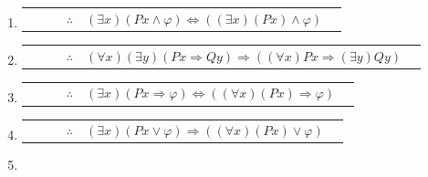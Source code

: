 \documentclass[12pt]{report}
\theoremstyle{largebreak}
\newcounter{tablec}
\begin{document}
\begin{excer}
\begin{enumerate}[label=($\alph*$)]
\begin{center}
\begin{tabular}{l r l c l r}
                \end{tabular}
            \end{center}
            \item \begin{center}
                \setcounter{tablec}{1}
                \begin{tabular}{l r l c l r}
                    \hline
                    & & & $\therefore$ & $(\exists x)(Px\land\varphi)\iff((\exists x)(Px)\land\varphi)$ & \\
                \end{tabular}
            \end{center}
            \item \begin{center}
                \setcounter{tablec}{1}
                \begin{tabular}{l r l c l r}
                    \hline
                    & & & $\therefore$ & $(\forall x)(\exists y)(Px\Rightarrow Qy)\Rightarrow((\forall x)Px\Rightarrow(\exists y)Qy)$ & \\
                \end{tabular}
            \end{center}
            \item \begin{center}
                \setcounter{tablec}{1}
                \begin{tabular}{l r l c l r}
                    \hline
                    & & & $\therefore$ & $(\exists x)(Px\Rightarrow\varphi)\iff((\forall x)(Px)\Rightarrow\varphi)$ & \\
                \end{tabular}
            \end{center}
            \item \begin{center}
                \setcounter{tablec}{1}
                \begin{tabular}{l r l c l r}
                    \hline
                    & & & $\therefore$ & $(\exists x)(Px\lor\varphi)\Rightarrow((\forall x)(Px)\lor\varphi)$ & \\
                \end{tabular}
            \end{center}
            \item \begin{center}
                \setcounter{tablec}{1}
                \begin{tabular}{l r l c l r}

\end{tabular}
\end{center}
\end{enumerate}
\end{excer}
\end{document}
